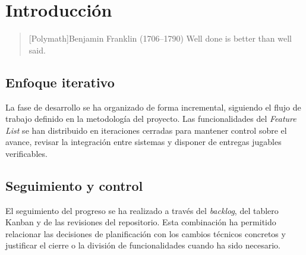 \chapter{Introducción}

\begin{quotation}[Polymath]{Benjamin Franklin (1706--1790)}
Well done is better than well said.
\end{quotation}

\begin{abstract}
En esta parte se documenta la ejecución técnica del proyecto y su seguimiento a través
de iteraciones. Cada iteración recoge las funcionalidades trabajadas, las decisiones de
diseño, la implementación realizada y los resultados obtenidos.
\end{abstract}

\section{Enfoque iterativo}
La fase de desarrollo se ha organizado de forma incremental, siguiendo el flujo de trabajo
definido en la metodología del proyecto. Las funcionalidades del \textit{Feature List} se
han distribuido en iteraciones cerradas para mantener control sobre el avance, revisar la
integración entre sistemas y disponer de entregas jugables verificables.

\section{Seguimiento y control}
El seguimiento del progreso se ha realizado a través del \textit{backlog}, del tablero
Kanban y de las revisiones del repositorio. Esta combinación ha permitido relacionar las
decisiones de planificación con los cambios técnicos concretos y justificar el cierre o la
división de funcionalidades cuando ha sido necesario.
